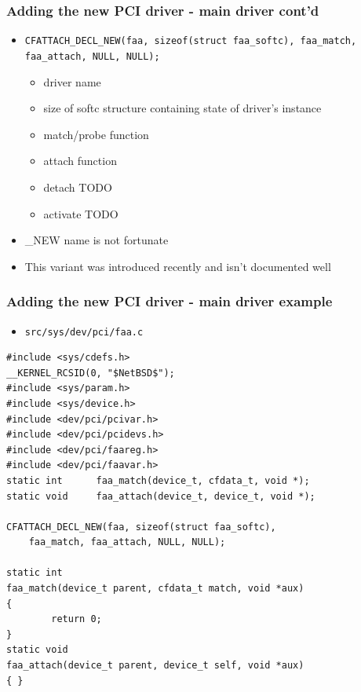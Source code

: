 \documentclass[dvipsnames,table]{beamer}
\begin{document}
\begin{frame}
\frametitle{Adding the new PCI driver - main driver cont'd}
\begin{itemize}
	\item {\tt CFATTACH\_DECL\_NEW(faa, sizeof(struct faa\_softc),
    faa\_match, faa\_attach, NULL, NULL);}
	\begin{itemize}
		\item driver name
		\item size of softc structure containing state of driver's instance
		\item match/probe function
		\item attach function
		\item detach TODO
		\item activate TODO
	\end{itemize}
	\item \_NEW name is not fortunate
	\item This variant was introduced recently and isn't documented well
\end{itemize}
\end{frame}




\begin{frame}[fragile]
\frametitle{Adding the new PCI driver - main driver example}
\scriptsize
\begin{itemize}
	\item {\tt src/sys/dev/pci/faa.c}
\end{itemize}
\begin{verbatim}
#include <sys/cdefs.h>
__KERNEL_RCSID(0, "$NetBSD$");
#include <sys/param.h>
#include <sys/device.h>
#include <dev/pci/pcivar.h>
#include <dev/pci/pcidevs.h>
#include <dev/pci/faareg.h>
#include <dev/pci/faavar.h>
static int      faa_match(device_t, cfdata_t, void *);
static void     faa_attach(device_t, device_t, void *);

CFATTACH_DECL_NEW(faa, sizeof(struct faa_softc),
    faa_match, faa_attach, NULL, NULL);

static int
faa_match(device_t parent, cfdata_t match, void *aux)
{
        return 0;
}
static void
faa_attach(device_t parent, device_t self, void *aux)
{ }
\end{verbatim}
\end{frame}
\end{document}
